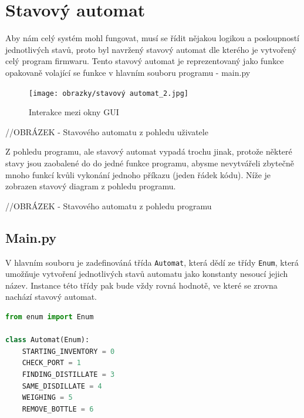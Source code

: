 \section{Stavový automat}
Aby nám celý systém mohl fungovat, musí se řídit nějakou logikou a posloupností jednotlivých stavů, proto byl navržený stavový automat dle kterého je vytvořený celý program firmwaru. Tento stavový automat je reprezentovaný jako funkce opakovaně volající se funkce v hlavním souboru programu - main.py

\begin{figure}[H]
    \begin{center}
        \texttt{[image: obrazky/stavový automat\_2.jpg]}
    \end{center}
    \caption{Interakce mezi okny GUI}
    \label{Interakce mezi okny GUI}
\end{figure}
//OBRÁZEK - Stavového automatu z pohledu uživatele

Z pohledu programu, ale stavový automat vypadá trochu jinak, protože některé stavy jsou zaobalené do do jedné funkce programu, abysme nevytvářeli zbytečně mnoho funkcí kvůli vykonání jednoho příkazu (jeden řádek kódu). Níže je zobrazen stavový diagram z pohledu programu.

//OBRÁZEK - Stavového automatu z pohledu programu

\subsection{Main.py}

V hlavním souboru je zadefinováná třída \texttt{Automat}, která dědí ze třídy \texttt{Enum}, která umožňuje vytvoření jednotlivých stavů automatu jako konstanty nesoucí jejich název. Instance této třídy pak bude vždy rovná hodnotě, ve které se zrovna nachází stavový automat.

\begin{lstlisting}[language=Python, caption=Hlavní okno, frame=single]
from enum import Enum

class Automat(Enum):
    STARTING_INVENTORY = 0
    CHECK_PORT = 1
    FINDING_DISTILLATE = 3
    SAME_DISDILLATE = 4
    WEIGHING = 5
    REMOVE_BOTTLE = 6
\end{lstlisting}


